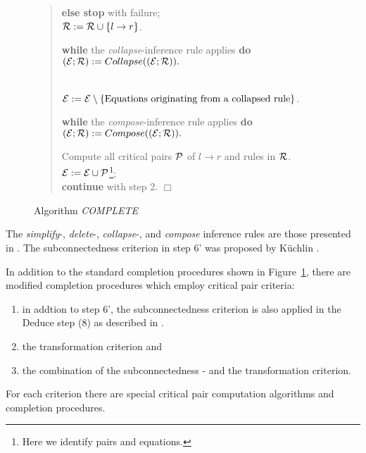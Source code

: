 \begin{figure}[ht]
\begin{center}
{\begin{minipage}{5.5in}
\begin{quote}
\begin{description}
      {\bf else stop} with failure; \\
      \( {\cal R} := {\cal R} \cup \{ l \rightarrow r \} \).
 \item[{(6) [Collapse.]}] {\bf while} the {\em collapse}-inference rule
     applies {\bf do} \\
    \( ({\cal E};{\cal R}) := Collapse(({\cal E};{\cal R})). \)
 \item[{(6') [Subconnectedness criterion.]}] \null \\
    \( {\cal E} := {\cal E} \setminus \{ \mbox{Equations originating from a
    collapsed rule} \} \).
 \item[{(7) [Compose.]}] {\bf while} the {\em compose}-inference rule
   applies {\bf do} \\
   \( ({\cal E};{\cal R}) := Compose(({\cal E};{\cal R})). \)
 \item[{(8) [Deduce.]}] Compute all critical pairs ${\cal P}$ of 
    $l \rightarrow r$ and rules
    in $\cal R$. \( {\cal E} := {\cal E} \cup {\cal P} \)\footnote{Here we
                                             identify pairs and equations.};
    \\ {\bf continue} with step 2. \hfill $\Box$
\end{description}
\end{quote}
\end{minipage}
}
\end{center}
\caption{Algorithm {\em COMPLETE}} \label{fi:cmpl}
\end{figure}
The {\em simplify}-, {\em delete}-, {\em collapse}-, and {\em compose}
inference rules are those presented in \cite{Dershowitz:89}.
The subconnectedness criterion in step 6' was proposed by K{\"u}chlin
\cite{Kuechlin:86}.

In addition to the standard completion procedures shown in 
Figure~\ref{fi:cmpl}, there are modified 
completion procedures which employ critical pair criteria:
\begin{enumerate}
 \item in addtion to step 6',
  the subconnectedness criterion is also applied in the Deduce step (8)
  as described in \cite{Kuechlin:86}.
 \item the transformation criterion \cite{Buendgen:91b} and
 \item the combination of the subconnectedness - and the
  transformation criterion.
\end{enumerate}
For each criterion there are special critical pair computation algorithms and
completion procedures.

